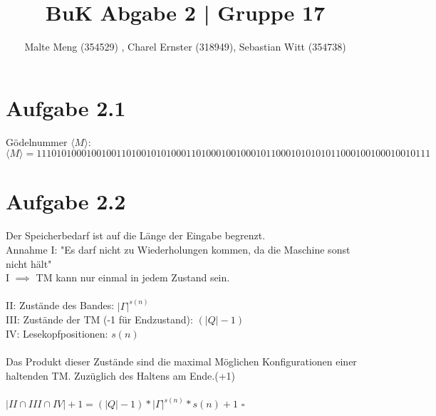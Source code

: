 \documentclass{article}
\title{BuK Abgabe 2 | Gruppe 17}
\author{Malte Meng (354529) , Charel Ernster (318949), Sebastian Witt (354738)}
\begin{document}
	\maketitle 
	\section[a 2.1]{Aufgabe 2.1}
	Gödelnummer $\langle M\rangle$:\\
	$\langle M\rangle = 111 0101000100100 11 010010101000 11 01000100100010 11 00010101010 11 000100100010010 111 $
	\section[a 2.2]{Aufgabe 2.2}
	Der Speicherbedarf ist auf die Länge der Eingabe begrenzt.\\
	Annahme I: "Es darf nicht zu Wiederholungen kommen, da die Maschine sonst nicht hält"\\
	I $\implies$ TM kann nur einmal in jedem Zustand sein.\\\\
	II: Zustände des Bandes: $|\Gamma|^{s(n)}$ \\
	III: Zustände der TM (-1 für Endzustand): $(|Q| - 1)$\\
	IV: Lesekopfpositionen: $s(n)$\\\\
	Das Produkt dieser Zustände sind die maximal Möglichen Konfigurationen einer haltenden TM. Zuzüglich des Haltens am Ende.(+1)\\\\
	$|II \cap III \cap IV| +1 = (|Q| - 1) * |\Gamma|^{s(n)} * s(n)+1$
	\quad$\square$\\
	
\end{document}
